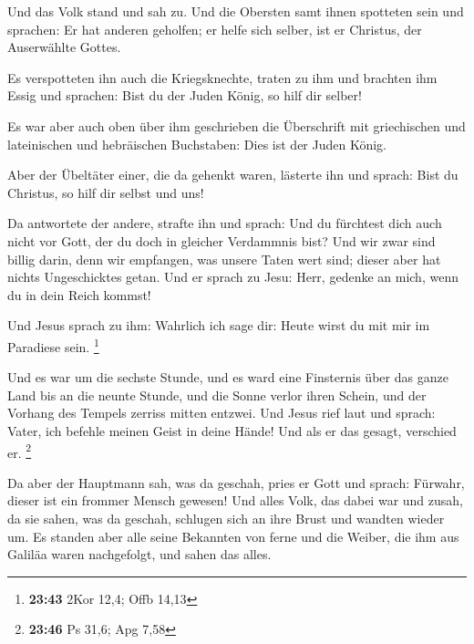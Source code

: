  Und das Volk stand und sah zu. Und die Obersten samt
ihnen spotteten sein und sprachen: Er hat anderen geholfen; er helfe
sich selber, ist er Christus, der Auserwählte Gottes.

 Es verspotteten ihn auch die Kriegsknechte, traten zu
ihm und brachten ihm Essig  und sprachen: Bist du der
Juden König, so hilf dir selber!

 Es war aber auch oben über ihm geschrieben die
Überschrift mit griechischen und lateinischen und hebräischen
Buchstaben: Dies ist der Juden König.

 Aber der Übeltäter einer, die da gehenkt waren, lästerte
ihn und sprach: Bist du Christus, so hilf dir selbst und uns!

 Da antwortete der andere, strafte ihn und sprach: Und du
fürchtest dich auch nicht vor Gott, der du doch in gleicher Verdammnis
bist?  Und wir zwar sind billig darin, denn wir
empfangen, was unsere Taten wert sind; dieser aber hat nichts
Ungeschicktes getan.  Und er sprach zu Jesu: Herr,
gedenke an mich, wenn du in dein Reich kommst!

 Und Jesus sprach zu ihm: Wahrlich ich sage dir: Heute
wirst du mit mir im Paradiese sein. \footnote{\textbf{23:43} 2Kor 12,4;
  Offb 14,13}

 Und es war um die sechste Stunde, und es ward eine
Finsternis über das ganze Land bis an die neunte Stunde, 
und die Sonne verlor ihren Schein, und der Vorhang des Tempels zerriss
mitten entzwei.  Und Jesus rief laut und sprach: Vater,
ich befehle meinen Geist in deine Hände! Und als er das gesagt,
verschied er. \footnote{\textbf{23:46} Ps 31,6; Apg 7,58}

 Da aber der Hauptmann sah, was da geschah, pries er Gott
und sprach: Fürwahr, dieser ist ein frommer Mensch gewesen!
 Und alles Volk, das dabei war und zusah, da sie sahen,
was da geschah, schlugen sich an ihre Brust und wandten wieder um.
 Es standen aber alle seine Bekannten von ferne und die
Weiber, die ihm aus Galiläa waren nachgefolgt, und sahen das alles.

